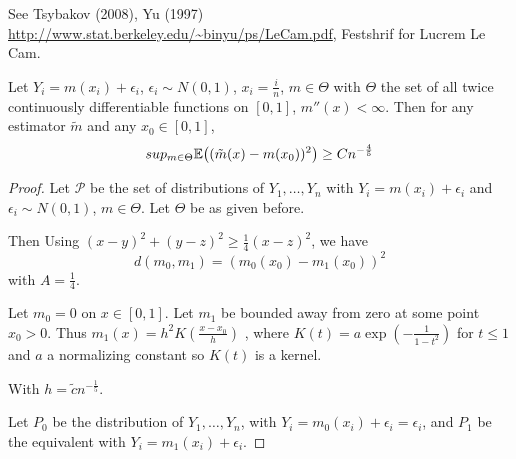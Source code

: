 See Tsybakov (2008), Yu (1997)
\url{http://www.stat.berkeley.edu/~binyu/ps/LeCam.pdf}, Festshrif for
Lucrem Le Cam.


\begin{thm}
  \label{defn:minimax_lower_bounds:1}
  Let $Y_{i} = m(x_{i}) + \epsilon_{i}$, $\epsilon_{i} \sim N(0, 1)$,
  $x_{i} = \frac{i}{n}$, $m \in \Theta$ with $\Theta$ the set of all
  twice continuously differentiable functions on $[0, 1]$, $m''(x) <
  \infty$.
  Then for any estimator $\tilde m$ and any $x_{0} \in [0, 1]$,
  \begin{equation}
    \label{eq:115}
    sup_{m \in \Theta} \E{(\tilde m(x) - m(x_{0}))^{2}} \geq C n^{-\frac{4}{5}}
  \end{equation}
\end{thm}

\begin{proof}
  Let $\mathcal{P}$ be the set of distributions of $Y_{1}, \dots,
  Y_{n}$ with $Y_{i} = m(x_{i}) + \epsilon_{i}$ and $\epsilon_{i} \sim
  N(0, 1)$, $m \in \Theta$. Let $\Theta$ be as given before.

  Then Using $(x - y)^{2} + (y - z)^{2} \geq \frac{1}{4} (x - z)^{2}$,
  we have
  \begin{equation}
    \label{eq:116}
    d(m_{0}, m_{1}) =  (m_{0}(x_{0}) - m_{1}(x_{0}))^{2}
  \end{equation} with $A = \frac{1}{4}$.

  Let $m_{0} = 0$ on $x \in [0, 1]$.  Let $m_{1}$ be bounded away from
  zero at some point $x_{0} > 0$.  Thus $m_{1}(x) = h^{2} K(\frac{x -
    x_{0}}{h})$ , where $K(t) = a \exp(- \frac{1}{1 - t^{2}})$ for $t
  \leq 1$ and $a$ a normalizing constant so $K(t)$ is a kernel.

  With $h = \tilde c n^{-\frac{1}{5}}$.

  Let $P_{0}$ be the distribution of $Y_{1}, \dots, Y_{n}$, with
  $Y_{i} = m_{0}(x_{i}) + \epsilon_{i} = \epsilon_{i}$, and $P_{1}$ be
  the equivalent with $Y_{i} = m_{1}(x_{i}) + \epsilon_{i}$.


\end{proof}
